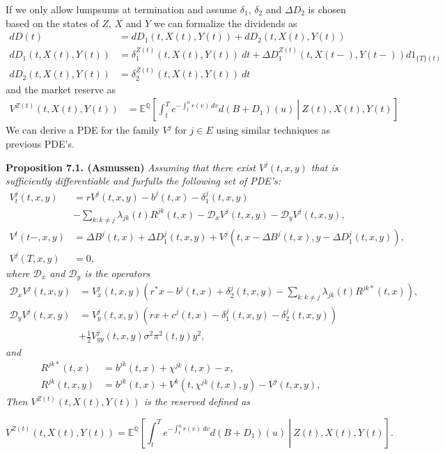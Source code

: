 \documentclass[a4paper,12pt,openany]{book}
\begin{document}
If we only allow lumpsums at termination and assume \(\delta_1\), \(\delta_2\) and \(\Delta D_2\) is chosen based on the states of \(Z\), \(X\) and \(Y\) we can formalize the dividends as
\begin{align*}
dD(t)&=dD_1(t,X(t),Y(t))+dD_2(t,X(t),Y(t))\\
dD_1(t,X(t),Y(t))&=\delta_1^{Z(t)}(t,X(t),Y(t))\ dt+\Delta D_1^{Z(t)}(t,X(t-),Y(t-))d1_{\{T\}(t)}\\
dD_2(t,X(t),Y(t))&=\delta_2^{Z(t)}(t,X(t),Y(t))\ dt
\end{align*}
and the market reserve as
\begin{align*}
V^{Z(t)}(t,X(t),Y(t))&=\mathbb E^\mathbb Q\left[\left.\int_t^Te^{-\int_t^ur(v)\ dv}d(B+D_1)(u)\ \right\vert\ Z(t),X(t),Y(t)\right]
\end{align*}
We can derive a PDE for the family \(V^j\) for \(j\in E\) using similar techniques as previous PDE's.

\textbf{Proposition 7.1. (Asmussen)} \emph{Assuming that there exist \(V^j(t,x,y)\) that is sufficiently differentiable and furfulls the following set of PDE's:}
\begin{align*}
V_t^j(t,x,y)&=rV^j(t,x,y)-b^j(t,x)-\delta_1^j(t,x,y)\\
&-\sum_{k:k\ne j}\lambda_{jk}(t)R^{jk}(t,x)-\mathcal D_x V^j(t,x,y)-\mathcal D_yV^j(t,x,y),\\
V^t(t-,x,y)&=\Delta B^j(t,x)+\Delta D_1^j(t,x,y)+V^j(t,x-\Delta B^j(t,x),y-\Delta D_1^j(t,x,y)),\\
V^j(T,x,y)&=0,
\end{align*}
\emph{where \(\mathcal D_x\) and \(\mathcal D_y\) is the operators}
\begin{align*}
\mathcal D_xV^j(t,x,y)&=V_x^j(t,x,y)\left(r^*x-b^j(t,x)+\delta_2^j(t,x,y)-\sum_{k:k\ne j}\lambda_{jk}(t)R^{jk*}(t,x)\right),\\
\mathcal D_yV^j(t,x,y)&=V_y^j(t,x,y)\left(rx+c^j(t,x)-\delta_1^j(t,x,y)-\delta_2^j(t,x,y)\right)\\
&+\frac{1}{2}V_{yy}^j(t,x,y)\sigma^2 \pi^2(t,y)y^2,
\end{align*}
\emph{and}
\begin{align*}
R^{jk*}(t,x)&=b^{jk}(t,x)+\chi^{jk}(t,x)-x,\\
R^{jk}(t,x,y)&=b^{jk}(t,x)+V^k(t,\chi^{jk}(t,x),y)-V^j(t,x,y),
\end{align*}
\emph{Then \(V^{Z(t)}(t,X(t),Y(t))\) is the reserved defined as}

\[
V^{Z(t)}(t,X(t),Y(t))=\mathbb E^\mathbb Q\left[\left.\int_t^Te^{-\int_t^ur(v)\ dv}d(B+D_1)(u)\ \right\vert\ Z(t),X(t),Y(t)\right].
\]
\end{document}

